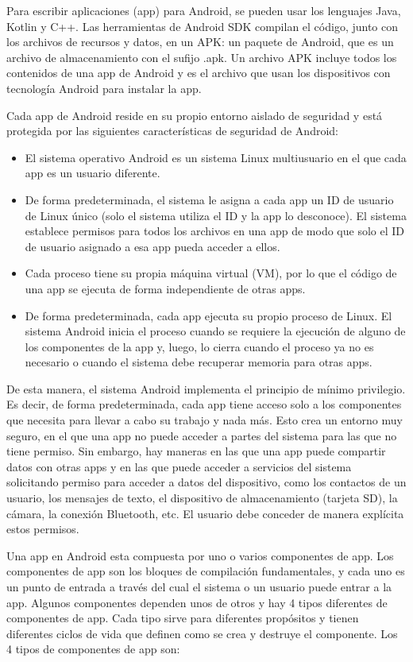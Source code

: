 Para escribir aplicaciones (app) para Android, se pueden usar los lenguajes Java, Kotlin y C++. Las herramientas de Android SDK compilan el código, junto con los archivos de recursos y datos, en un APK: un paquete de Android, que es un archivo de almacenamiento con el sufijo .apk. Un archivo APK incluye todos los contenidos de una app de Android y es el archivo que usan los dispositivos con tecnología Android para instalar la app.

Cada app de Android reside en su propio entorno aislado de seguridad y está protegida por las siguientes características de seguridad de Android:
\begin{itemize}
	\item El sistema operativo Android es un sistema Linux multiusuario en el que cada app es un usuario diferente.
	\item De forma predeterminada, el sistema le asigna a cada app un ID de usuario de Linux único (solo el sistema utiliza el ID y la app lo desconoce). El sistema establece permisos para todos los archivos en una app de modo que solo el ID de usuario asignado a esa app pueda acceder a ellos.
	\item Cada proceso tiene su propia máquina virtual (VM), por lo que el código de una app se ejecuta de forma independiente de otras apps.
	\item De forma predeterminada, cada app ejecuta su propio proceso de Linux. El sistema Android inicia el proceso cuando se requiere la ejecución de alguno de los componentes de la app y, luego, lo cierra cuando el proceso ya no es necesario o cuando el sistema debe recuperar memoria para otras apps.
\end{itemize}

De esta manera, el sistema Android implementa el principio de mínimo privilegio. Es decir, de forma predeterminada, cada app tiene acceso solo a los componentes que necesita para llevar a cabo su trabajo y nada más. Esto crea un entorno muy seguro, en el que una app no puede acceder a partes del sistema para las que no tiene permiso. Sin embargo, hay maneras en las que una app puede compartir datos con otras apps y en las que puede acceder a servicios del sistema solicitando permiso para acceder a datos del dispositivo, como los contactos de un usuario, los mensajes de texto, el dispositivo de almacenamiento (tarjeta SD), la cámara, la conexión Bluetooth, etc. El usuario debe conceder de manera explícita estos permisos.

Una app en Android esta compuesta por uno o varios componentes de app. Los componentes de app son los bloques de compilación fundamentales, y cada uno es un punto de entrada a través del cual el sistema o un usuario puede entrar a la app. Algunos componentes dependen unos de otros y hay 4 tipos diferentes de componentes de app. Cada tipo sirve para diferentes propósitos y tienen diferentes ciclos de vida que definen como se crea y destruye el componente. Los 4 tipos de componentes de app son:

